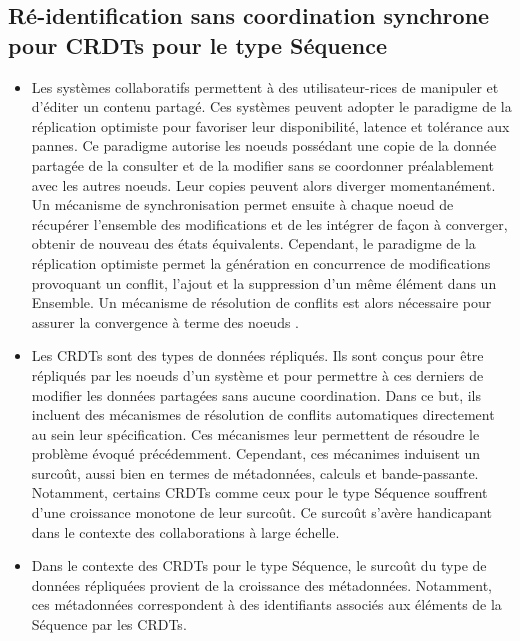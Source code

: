 \subsection{Ré-identification sans coordination synchrone pour \acp{CRDT} pour le type Séquence}
\label{sec:research-questions-rls}
\begin{itemize}
    \item Les systèmes collaboratifs permettent à des utilisateur-rices de manipuler et d'éditer un contenu partagé.
        Ces systèmes peuvent adopter le paradigme de la réplication optimiste \cite{2005-optimistic-replication-saito} pour favoriser leur disponibilité, latence et tolérance aux pannes.
        Ce paradigme autorise les noeuds possédant une copie de la donnée partagée de la consulter et de la modifier sans se coordonner préalablement avec les autres noeuds.
        Leur copies peuvent alors diverger momentanément.
        Un mécanisme de synchronisation permet ensuite à chaque noeud de récupérer l'ensemble des modifications et de les intégrer de façon à converger, \ie obtenir de nouveau des états équivalents.
        Cependant, le paradigme de la réplication optimiste permet la génération en concurrence de modifications provoquant un conflit, \eg l'ajout et la suppression d'un même élément dans un Ensemble.
        Un mécanisme de résolution de conflits est alors nécessaire pour assurer la convergence à terme des noeuds \cite{10.1145/224057.224070}.
    \item Les \acp{CRDT} \cite{2007-crdt-shapiro,shapiro_2011_crdt} sont des types de données répliqués.
        Ils sont conçus pour être répliqués par les noeuds d'un système et pour permettre à ces derniers de modifier les données partagées sans aucune coordination.
        Dans ce but, ils incluent des mécanismes de résolution de conflits automatiques directement au sein leur spécification.
        Ces mécanismes leur permettent de résoudre le problème évoqué précédemment.
        Cependant, ces mécanimes induisent un surcoût, aussi bien en termes de métadonnées, calculs et bande-passante.
        Notamment, certains \acp{CRDT} comme ceux pour le type Séquence souffrent d'une croissance monotone de leur surcoût.
        Ce surcoût s'avère handicapant dans le contexte des collaborations à large échelle.
    \item Dans le contexte des \acp{CRDT} pour le type Séquence, le surcoût du type de données répliquées provient de la croissance des métadonnées.
        Notamment, ces métadonnées correspondent à des identifiants associés aux éléments de la Séquence par les \acp{CRDT}.

\end{itemize}
